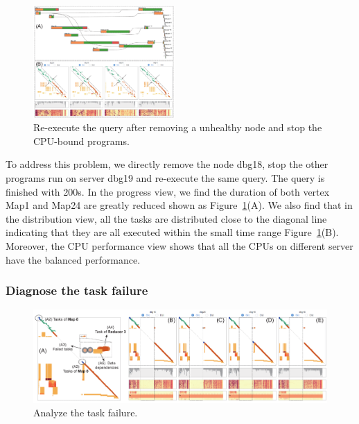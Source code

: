 \begin{figure}[t]
	\centering
	\includegraphics[width=0.48\textwidth]{figures/case_study/CaseStudy1.pdf}
	\vspace{-3mm}
	\caption{Re-execute the query after removing a unhealthy node and stop the CPU-bound programs.}
	\label{fig:casestudy1}
	\vspace{-3mm}
\end{figure}


To address this problem, we directly remove the node dbg18, stop the other programs run on server dbg19 and re-execute the same query. The query is finished with 200s. In the progress view, we find the duration of both vertex Map1 and Map24 are greatly reduced shown as Figure~\ref{fig:casestudy1}(A). We also find that in the distribution view, all the tasks are distributed close to the diagonal line indicating that they are all executed within the small time range Figure~\ref{fig:casestudy1}(B). Moreover, the CPU performance view shows that all the CPUs on different server have the balanced performance. 

\subsubsection{Diagnose the task failure}



\begin{figure}
	\vspace{2mm}
	\centering
	\small
	\includegraphics[width=1\textwidth]{figures/case_study/CaseStudy2.pdf}  

	\caption{Analyze the task failure.} 
	\label{fig:casestudy2}

\end{figure}


